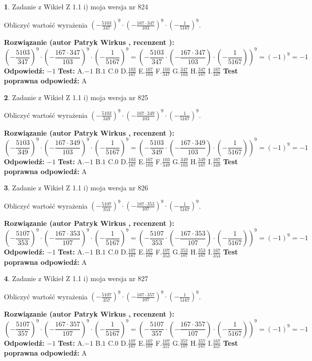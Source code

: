 \documentclass[12pt, a4paper]{article}
\theoremstyle{definition} %
\newtheorem{zad}{}
\newcommand{\zadStart}[1]{\begin{zad}#1\newline}
\newcommand{\zadStop}{\end{zad}}
\newcommand{\rozwStart}[2]{\noindent \textbf{Rozwiązanie (autor #1 , recenzent #2): }\newline}
\newcommand{\rozwStop}{\newline}
\newcommand{\odpStart}{\noindent \textbf{Odpowiedź:}\newline}
\newcommand{\odpStop}{\newline}
\newcommand{\testStart}{\noindent \textbf{Test:}\newline}
\newcommand{\testStop}{\newline}
\newcommand{\kluczStart}{\noindent \textbf{Test poprawna odpowiedź:}\newline}
\newcommand{\kluczStop}{\newline}
\begin{document}
\zadStart{Zadanie z Wikieł Z 1.1 i) moja wersja nr 824}

Obliczyć wartość wyrażenia $(-\frac{5103}{347})^{9} \cdot (-\frac{167 \cdot 347}{103})^{9} \cdot (-\frac{1}{5167})^{9}$.
\zadStop
\rozwStart{Patryk Wirkus}{}
$$(-\frac{5103}{347})^{9} \cdot (-\frac{167 \cdot 347}{103})^{9} \cdot (-\frac{1}{5167})^{9} = (-\frac{5103}{347} \cdot (-\frac{167 \cdot 347}{103}) \cdot (-\frac{1}{5167}))^{9} = (-1)^{9} = -1$$
\rozwStop
\odpStart
$-1$
\odpStop
\testStart
A.$-1$ B.$1$ C.$0$ D.$\frac{103}{167}$ E.$\frac{167}{103}$
F.$\frac{103}{347}$ G.$\frac{347}{103}$
H.$\frac{347}{167}$
I.$\frac{167}{347}$
\testStop
\kluczStart
A
\kluczStop



\zadStart{Zadanie z Wikieł Z 1.1 i) moja wersja nr 825}

Obliczyć wartość wyrażenia $(-\frac{5103}{349})^{9} \cdot (-\frac{167 \cdot 349}{103})^{9} \cdot (-\frac{1}{5167})^{9}$.
\zadStop
\rozwStart{Patryk Wirkus}{}
$$(-\frac{5103}{349})^{9} \cdot (-\frac{167 \cdot 349}{103})^{9} \cdot (-\frac{1}{5167})^{9} = (-\frac{5103}{349} \cdot (-\frac{167 \cdot 349}{103}) \cdot (-\frac{1}{5167}))^{9} = (-1)^{9} = -1$$
\rozwStop
\odpStart
$-1$
\odpStop
\testStart
A.$-1$ B.$1$ C.$0$ D.$\frac{103}{167}$ E.$\frac{167}{103}$
F.$\frac{103}{349}$ G.$\frac{349}{103}$
H.$\frac{349}{167}$
I.$\frac{167}{349}$
\testStop
\kluczStart
A
\kluczStop



\zadStart{Zadanie z Wikieł Z 1.1 i) moja wersja nr 826}

Obliczyć wartość wyrażenia $(-\frac{5107}{353})^{9} \cdot (-\frac{167 \cdot 353}{107})^{9} \cdot (-\frac{1}{5167})^{9}$.
\zadStop
\rozwStart{Patryk Wirkus}{}
$$(-\frac{5107}{353})^{9} \cdot (-\frac{167 \cdot 353}{107})^{9} \cdot (-\frac{1}{5167})^{9} = (-\frac{5107}{353} \cdot (-\frac{167 \cdot 353}{107}) \cdot (-\frac{1}{5167}))^{9} = (-1)^{9} = -1$$
\rozwStop
\odpStart
$-1$
\odpStop
\testStart
A.$-1$ B.$1$ C.$0$ D.$\frac{107}{167}$ E.$\frac{167}{107}$
F.$\frac{107}{353}$ G.$\frac{353}{107}$
H.$\frac{353}{167}$
I.$\frac{167}{353}$
\testStop
\kluczStart
A
\kluczStop



\zadStart{Zadanie z Wikieł Z 1.1 i) moja wersja nr 827}

Obliczyć wartość wyrażenia $(-\frac{5107}{357})^{9} \cdot (-\frac{167 \cdot 357}{107})^{9} \cdot (-\frac{1}{5167})^{9}$.
\zadStop
\rozwStart{Patryk Wirkus}{}
$$(-\frac{5107}{357})^{9} \cdot (-\frac{167 \cdot 357}{107})^{9} \cdot (-\frac{1}{5167})^{9} = (-\frac{5107}{357} \cdot (-\frac{167 \cdot 357}{107}) \cdot (-\frac{1}{5167}))^{9} = (-1)^{9} = -1$$
\rozwStop
\odpStart
$-1$
\odpStop
\testStart
A.$-1$ B.$1$ C.$0$ D.$\frac{107}{167}$ E.$\frac{167}{107}$
F.$\frac{107}{357}$ G.$\frac{357}{107}$
H.$\frac{357}{167}$
I.$\frac{167}{357}$
\testStop
\kluczStart
A
\kluczStop
\end{document}
